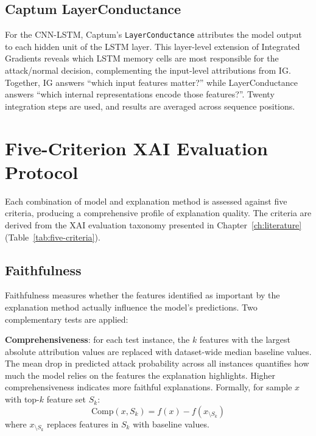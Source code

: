 \documentclass[12pt,a4paper]{report}
\begin{document}
\subsection{Captum LayerConductance}
\label{sec:conductance}

For the CNN-LSTM, Captum's \texttt{LayerConductance} attributes the model output to each hidden unit of the LSTM layer. This layer-level extension of Integrated Gradients reveals which LSTM memory cells are most responsible for the attack/normal decision, complementing the input-level attributions from IG. Together, IG answers ``which input features matter?'' while LayerConductance answers ``which internal representations encode those features?''. Twenty integration steps are used, and results are averaged across sequence positions.

\section{Five-Criterion XAI Evaluation Protocol}
\label{sec:five-criterion}

Each combination of model and explanation method is assessed against five criteria, producing a comprehensive profile of explanation quality. The criteria are derived from the XAI evaluation taxonomy presented in Chapter~\ref{ch:literature} (Table~\ref{tab:five-criteria}).

\subsection{Faithfulness}
\label{sec:faithfulness}

Faithfulness measures whether the features identified as important by the explanation method actually influence the model's predictions. Two complementary tests are applied:

\textbf{Comprehensiveness}: for each test instance, the $k$ features with the largest absolute attribution values are replaced with dataset-wide median baseline values. The mean drop in predicted attack probability across all instances quantifies how much the model relies on the features the explanation highlights. Higher comprehensiveness indicates more faithful explanations. Formally, for sample $x$ with top-$k$ feature set $S_k$:
\begin{equation}
\text{Comp}(x, S_k) = f(x) - f(x_{\setminus S_k})
\end{equation}
where $x_{\setminus S_k}$ replaces features in $S_k$ with baseline values.
\end{document}
